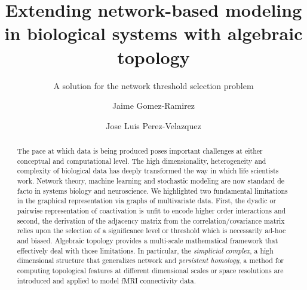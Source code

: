 \documentclass[onecollarge,runningheads]{svjour2}
\begin{document}
\title{Extending network-based modeling in biological systems with algebraic topology
}
\subtitle{A solution for the network threshold selection problem\\ }
\author{Jaime Gomez-Ramirez        \and
        Jose Luis Perez-Velazquez %
}
\maketitle

\begin{abstract}
The pace at which data is being produced poses important challenges at either conceptual and computational level. The high dimensionality, heterogeneity and complexity of biological data has deeply transformed the way in which life scientists work. Network theory, machine learning and stochastic modeling are now standard de facto in systems biology and neuroscience.
We highlighted two fundamental limitations in the graphical representation via graphs of multivariate data. First, the dyadic or pairwise representation of coactivation is unfit to encode higher order interactions and second, the derivation of the adjacency matrix from the correlation/covariance matrix relies upon the selection of a significance level or threshold which is necessarily ad-hoc and biased.
Algebraic topology provides a multi-scale mathematical framework that effectively deal with those limitations. In particular, the \emph{simplicial complex}, a high dimensional structure that generalizes network and \emph{persistent homology}, a method for computing topological features at different dimensional scales or space resolutions are introduced and applied to model fMRI connectivity data.

\end{abstract}
\end{document}
